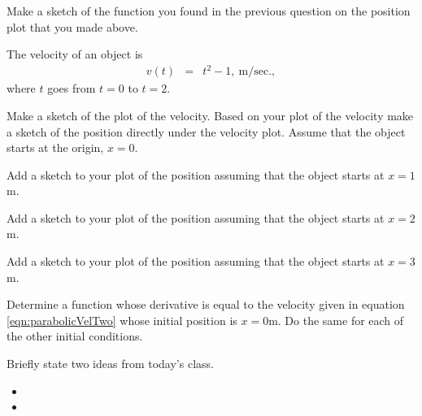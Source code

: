 \begin{problem}
\begin{subproblem}
    \vspace{3em}

    \vspace{3em}

  \item Make a sketch of the function you found in the previous
    question on the position plot that you made above.

  \end{subproblem}

  \clearpage

\item The velocity of an object is
  \begin{eqnarray}
    \label{eqn:parabolicVelTwo}
    v(t) & = & t^2  - 1, ~ \mathrm{m/sec.},
  \end{eqnarray}
  where $t$ goes from $t=0$ to $t=2$.

  \begin{subproblem}
  \item Make a sketch of the plot of the velocity.  Based on your plot
    of the velocity make a sketch of the position directly under the velocity
    plot. Assume that the object starts at the origin, $x=0$.

    \vfill

  \item Add a sketch to your plot of the position assuming that the object starts
    at $x=1$m.

  \item Add a sketch to your plot of the position assuming that the object starts
    at $x=2$m.

  \item Add a sketch to your plot of the position assuming that the object starts
    at $x=3$m.

  \item Determine a function whose derivative is equal to the velocity
    given in equation \ref{eqn:parabolicVelTwo} whose initial position
    is $x=0$m. Do the same for each of the other initial conditions.

    \vspace{3em}

  \end{subproblem}

\postClass

\begin{problem}
\item Briefly state two ideas from today's class.
  \begin{itemize}
  \item
  \item
  \end{itemize}


\end{problem}
\end{problem}
